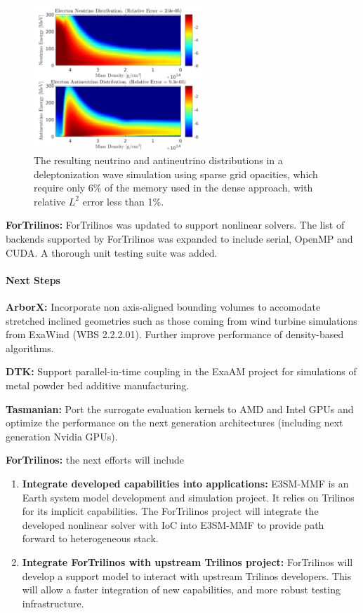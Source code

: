 \begin{figure}[htb]
        \centering
        \includegraphics[width=2.5in]{projects/2.3.3-MathLibs/2.3.3.14-ALExa-ForTrilinos/tasmanian_exastar}
\caption{\label{fig:tasmanian-exastar}
		The resulting neutrino and antineutrino distributions in a deleptonization
		wave simulation using sparse grid opacities, which require only 6\% of
		the memory used in the dense approach, with relative $L^2$ error less than 1\%.}
\end{figure}

{\bf ForTrilinos:} ForTrilinos was updated to support nonlinear solvers. The
list of backends supported by ForTrilinos was expanded to include serial,
OpenMP and CUDA. A thorough unit testing suite was added.


\paragraph{Next Steps}

\indent

{\bf ArborX:} Incorporate non axis-aligned bounding volumes to accomodate
stretched inclined geometries such as those coming from wind turbine
simulations from ExaWind (WBS 2.2.2.01). Further improve performance of
density-based algorithms.

{\bf DTK:} Support parallel-in-time coupling in the ExaAM project for
simulations of metal powder bed additive manufacturing.

{\bf Tasmanian:} Port the surrogate evaluation kernels to AMD and Intel
GPUs and optimize the performance on the next generation architectures
(including next generation Nvidia GPUs).

{\bf ForTrilinos:} the next efforts will include
\begin{enumerate}
  \item \textbf{Integrate developed capabilities into applications:} E3SM-MMF
    is an Earth system model development and simulation project. It relies on
    Trilinos for its implicit capabilities. The ForTrilinos project will
    integrate the developed nonlinear solver with IoC into E3SM-MMF to provide
    path forward to heterogeneous stack.
  \item \textbf{Integrate ForTrilinos with upstream Trilinos project:}
    ForTrilinos will develop a support model to interact with upstream Trilinos
    developers. This will allow a faster integration of new capabilities, and
    more robust testing infrastructure.
\end{enumerate}

